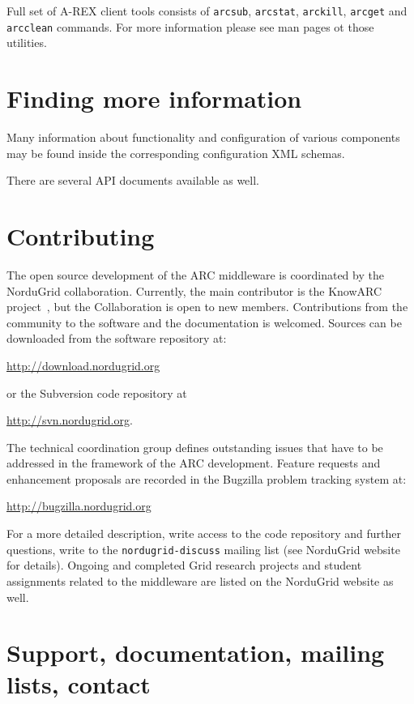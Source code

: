 \documentclass{article}                            %
\begin{document}
Full set of A-REX client tools consists of \texttt{arcsub}, \texttt{arcstat},
\texttt{arckill}, \texttt{arcget} and \texttt{arcclean} commands.
For more information please see man pages ot those utilities.

\section{Finding more information}
\label{sec:more-info}

Many information about functionality and configuration of various components
may be found inside the corresponding configuration XML schemas.

There are several API documents available as well.

\section{Contributing}
\label{sec:contributing}

The open source development of the ARC middleware is coordinated by the
NorduGrid collaboration. Currently, the main contributor is the KnowARC
project~\cite{knowarc}, but the Collaboration is open to new members.
Contributions from the community to the software and the documentation is
welcomed. Sources can be downloaded from the software repository at:

\url{http://download.nordugrid.org}

or the Subversion code repository at

\url{http://svn.nordugrid.org}.

The technical coordination group defines outstanding issues that have
to be addressed in the framework of the ARC development. Feature
requests and enhancement proposals are recorded in the Bugzilla problem
tracking system at:

 \url{http://bugzilla.nordugrid.org}

For a more detailed description, write access to the code repository and
further questions, write to the \texttt{nordugrid-discuss} mailing list (see
NorduGrid website~\cite{nordugrid} for details). Ongoing and completed Grid
research projects and student assignments related to the middleware are listed
on the NorduGrid website as well.


\section{Support, documentation, mailing lists, contact}
\label{sec:support}
\end{document}
